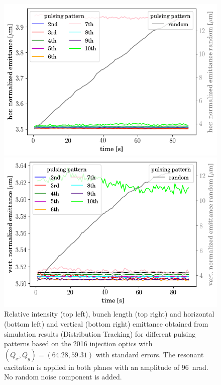 \documentclass[%
 reprint,
 amsmath,amssymb,
 aps,
prstab,
]{revtex4-1}
\begin{document}
\begin{figure}[h]
\begin{minipage}[t]{0.49\linewidth}
		\includegraphics[width=1.0\linewidth]{2016injerra2b2u_pattern_3_5um_emit1.png}
	\end{minipage}
	\begin{minipage}[t]{0.49\linewidth}
		\centering
		\includegraphics[width=1.0\linewidth]{2016injerra2b2u_pattern_3_5um_emit2.png}
	\end{minipage}	
	\caption{\label{fig:patternsim} Relative intensity (top left), bunch length (top right) and horizontal (bottom left) and vertical (bottom right) emittance obtained from simulation results (Distribution Tracking) for different pulsing patterns based on the 2016 injection optics with $(Q_x,Q_y)=(64.28,59.31)$ with standard errors. The resonant excitation is applied in both planes with an amplitude of 96~nrad. No random noise component is added.}
\end{figure}
\end{document}
